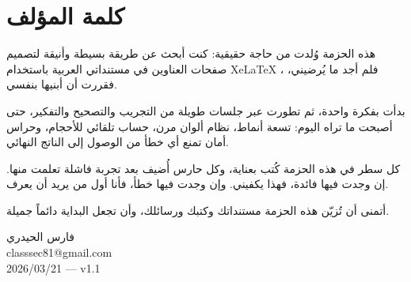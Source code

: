 \documentclass[a4paper,12pt]{report}
\newcommand{\en}[1]{\textenglish{ #1}}
\def\textenglish#1{#1}%
\begin{document}
\section{  كلمة المؤلف}



  هذه الحزمة وُلدت من حاجة حقيقية: كنت أبحث عن طريقة بسيطة
  وأنيقة لتصميم صفحات العناوين في مستنداتي العربية باستخدام
\en{ XeLaTeX} ، فلم أجد ما يُرضيني، فقررت أن أبنيها بنفسي.

  بدأت بفكرة واحدة، ثم تطورت عبر جلسات طويلة من التجريب والتصحيح والتفكير، حتى أصبحت ما تراه اليوم: تسعة أنماط، نظام ألوان مرن، حساب تلقائي للأحجام، وحراس أمان تمنع أي خطأ من الوصول إلى الناتج النهائي.

  كل سطر في هذه الحزمة كُتب بعناية، وكل حارس أُضيف بعد تجربة فاشلة تعلمت منها. إن وجدت فيها فائدة، فهذا يكفيني. وإن وجدت فيها خطأ، فأنا أول من يريد أن يعرف.

  أتمنى أن تُزيّن هذه الحزمة مستنداتك وكتبك ورسائلك، وأن تجعل البداية دائماً جميلة.
\\
\begin{center}
                                  فارس  الحيدري \\
                                 \en{  classsec81@gmail.com} \\
                                  \en{2026/03/21 — v1.1} 
\end{center}
\end{document}
